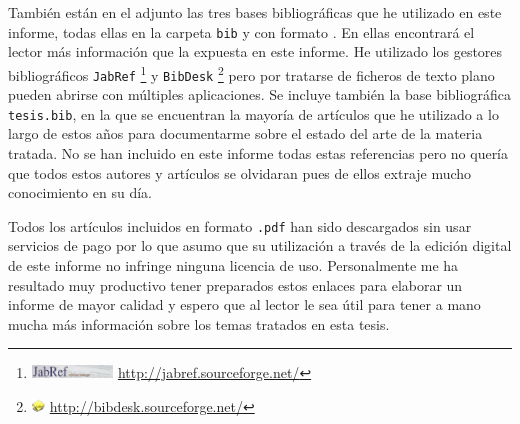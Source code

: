 También están en el \dvdAdjunto adjunto las tres bases bibliográficas que he utilizado en este informe, todas ellas en la carpeta \texttt{bib} y con formato \BibTeX. En ellas encontrará el lector más información que la expuesta en este informe. He utilizado los gestores bibliográficos \texttt{JabRef}  \footnote{\includegraphics[height=10pt]{./imagen/JabRef} \url{http://jabref.sourceforge.net/}} y \texttt{BibDesk} \footnote{\includegraphics[height=10pt]{./imagen/bibDeskIcon} \url{http://bibdesk.sourceforge.net/}} pero por tratarse de ficheros de texto plano pueden abrirse con múltiples aplicaciones. Se incluye también la base bibliográfica \texttt{tesis.bib}, en la que se encuentran la mayoría de artículos que he utilizado a lo largo de estos años para documentarme sobre el estado del arte de la materia tratada. No se han incluido en este informe todas estas referencias pero no quería que todos estos autores y artículos se olvidaran pues de ellos extraje mucho conocimiento en su día.

Todos los artículos incluidos en formato \texttt{.pdf} han sido descargados sin usar servicios de pago por lo que asumo que su utilización a través de la edición digital de este informe no infringe ninguna licencia de uso. Personalmente me ha resultado muy productivo tener preparados estos enlaces para elaborar un informe de mayor calidad y espero que al lector le sea útil para tener a mano mucha más información sobre los temas tratados en esta tesis.
